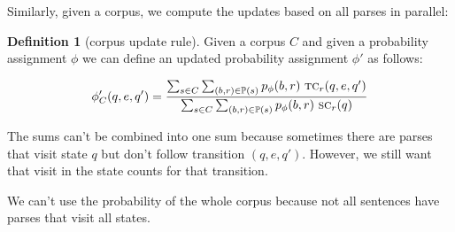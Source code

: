 \documentclass[12pt]{article}
\theoremstyle{definition}
\newtheorem{definition}{Definition}[section]
\begin{document}



Similarly, given a corpus, we compute the updates based on all parses in parallel:
\begin{definition}[corpus update rule]
  Given a corpus $C$ and given a probability assignment $\phi$ we can define an updated probability assignment $\phi'$ as follows:

 $$\phi_C'(q,e,q') = \frac{\sum_{s\in C}\sum_{(b,r)\in\mathbb{P}(s)} p_\phi(b,r)~ \text{\textsc{tc}}_r(q,e,q')}{\sum_{s\in C}\sum_{(b,r)\in\mathbb{P}(s)} p_\phi(b,r)~ \text{\textsc{sc}}_r(q)}$$ 
\end{definition}


The sums can't be combined into one sum because sometimes there are parses that visit state $q$ but don't follow transition $(q,e,q')$. However, we still want that visit in the state counts for that transition.

We can't use the probability of the whole corpus because not all sentences have parses that visit all states.
\end{document}

